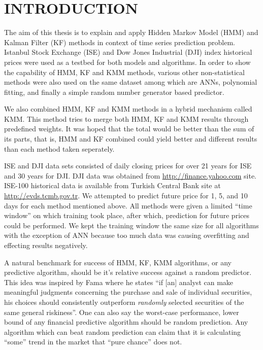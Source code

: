 \chapter{INTRODUCTION}

The aim of this thesis is to explain and apply Hidden Markov Model (HMM) and
Kalman Filter (KF) methods in context of time series prediction
problem. Istanbul Stock Exchange (ISE) and Dow Jones Industrial (DJI) index
historical prices were used as a testbed for both models and algorithms. In
order to show the capability of HMM, KF and KMM methods, various other
non-statistical methods were also used on the same dataset among which are ANNs,
polynomial fitting, and finally a simple random number generator based
predictor.

We also combined HMM, KF and KMM methods in a hybrid mechanism called KMM. This
method tries to merge both HMM, KF and KMM results through predefined weights. It was
hoped that the total would be better than the sum of its parts, that is, HMM and
KF combined could yield better and different results than each method taken
seperately. 

ISE and DJI data sets consisted of daily closing prices for over 21 years
for ISE and 30 years for DJI. DJI data was obtained from
\url{http://finance.yahoo.com} site. ISE-100 historical data is available
from Turkish Central Bank site at \url{http://evds.tcmb.gov.tr}. We
attempted to predict future price for 1, 5, and 10 days for each method
mentioned above. All methods were given a limited ``time window'' on which
training took place, after which, prediction for future prices could be
performed. We kept the training window the same size for all algorithms
with the exception of ANN because too much data was causing overfitting and
effecting results negatively.

A natural benchmark for success of HMM, KF, KMM algorithms, or any predictive
algorithm, should be it's relative success against a random predictor. This idea
was inspired by Fama \cite{famar} where he states ``if [an] analyst can make
meaningful judgments concerning the purchase and sale of individual securities,
his choices should consistently outperform {\em randomly} selected securities of
the same general riskiness''. One can also say the worst-case performance, lower
bound of any financial predictive algorithm should be random prediction. Any
algorithm which can beat random prediction can claim that it is calculating
``some'' trend in the market that ``pure chance'' does not.

